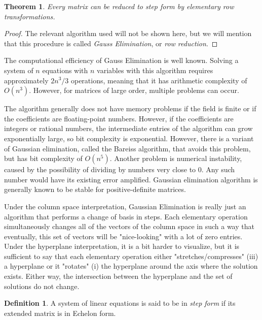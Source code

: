\documentclass{article}
\newtheorem{theorem}{Theorem}[section]
\theoremstyle{remark}
\theoremstyle{definition}
\newtheorem{definition}{Definition}[section]
\begin{document}
    \begin{theorem}
    Every matrix can be reduced to step form by elementary row transformations. 
    \end{theorem}

    \begin{proof}
    The relevant algorithm used will not be shown here, but we will mention that this procedure is called \textit{Gauss Elimination}, or \textit{row reduction}. 
    \end{proof}

    The computational efficiency of Gauss Elimination is well known. Solving a system of $n$ equations with $n$ variables with this algorithm requires approximately $2 n^3 / 3$ operations, meaning that it has arithmetic complexity of $O(n^3)$. However, for matrices of large order, multiple problems can occur. 

    The algorithm generally does not have memory problems if the field is finite or if the coefficients are floating-point numbers. However, if the coefficients are integers or rational numbers, the intermediate entries of the algorithm can grow exponentially large, so bit complexity is exponential. However, there is a variant of Gaussian elimination, called the Bareiss algorithm, that avoids this problem, but has bit complexity of $O(n^5)$. Another problem is numerical instability, caused by the possibility of dividing by numbers very close to $0$. Any such number would have its existing error amplified. Gaussian elimination algorithm is generally known to be stable for positive-definite matrices. 

    Under the column space interpretation, Gaussian Elimination is really just an algorithm that performs a change of basis in steps. Each elementary operation simultaneously changes all of the vectors of the column space in such a way that eventually, this set of vectors will be "nice-looking" with a lot of zero entries. Under the hyperplane interpretation, it is a bit harder to visualize, but it is sufficient to say that each elementary operation either "stretches/compresses" (iii) a hyperplane or it "rotates" (i) the hyperplane around the axis where the solution exists. Either way, the intersection between the hyperplane and the set of solutions do not change. 

    \begin{definition}
    A system of linear equations is said to be in \textit{step form} if its extended matrix is in Echelon form. 
    \end{definition}
\end{document}
